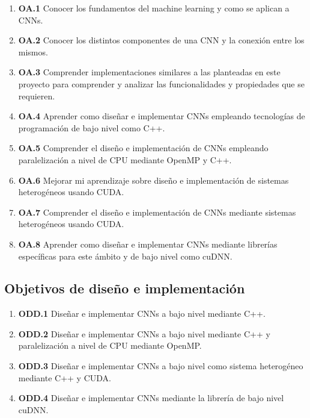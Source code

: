 \begin{enumerate}[label=\textbullet]
	\item \textbf{OA.1} Conocer los fundamentos del machine learning y como se aplican a CNNs.
	
	\item \textbf{OA.2} Conocer los distintos componentes de una CNN y la conexión entre los mismos.
	
	\item \textbf{OA.3} Comprender implementaciones similares a las planteadas en este proyecto para comprender y analizar las funcionalidades y propiedades que se requieren. 
	
	\item \textbf{OA.4} Aprender como diseñar e implementar CNNs empleando tecnologías de programación de bajo nivel como C++.
	
	\item \textbf{OA.5} Comprender el diseño e implementación de CNNs empleando paralelización a nivel de CPU mediante OpenMP y C++.
	
	\item \textbf{OA.6} Mejorar mi aprendizaje sobre diseño e implementación de sistemas heterogéneos usando CUDA.

	\item \textbf{OA.7} Comprender el diseño e implementación de CNNs mediante sistemas heterogéneos usando CUDA.

	\item \textbf{OA.8} Aprender como diseñar e implementar CNNs mediante librerías específicas para este ámbito y de bajo nivel como cuDNN.

\end{enumerate}

\subsection{Objetivos de diseño e implementación}

\begin{enumerate}[label=\textbullet]
	\item \textbf{ODD.1} Diseñar e implementar CNNs a bajo nivel mediante C++.
	
	\item \textbf{ODD.2} Diseñar e implementar CNNs a bajo nivel mediante C++ y paralelización a nivel de CPU mediante OpenMP.

	\item \textbf{ODD.3} Diseñar e implementar CNNs a bajo nivel como sistema heterogéneo mediante C++ y CUDA.

	\item \textbf{ODD.4} Diseñar e implementar CNNs mediante la librería de bajo nivel cuDNN.		
	
\end{enumerate}
